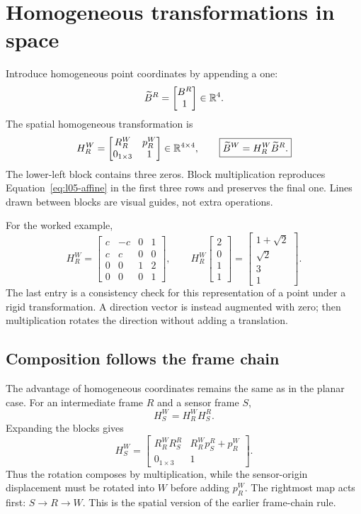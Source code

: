 \section{Homogeneous transformations in space}
Introduce homogeneous point coordinates by appending a one:
\[
 \widetilde B^R=\begin{bmatrix}B^R\\1\end{bmatrix}\in\mathbb{R}^4.
\]
The spatial homogeneous transformation is
\begin{equation}
 H_R^W=\begin{bmatrix}R_R^W&p_R^W\\0_{1\times3}&1\end{bmatrix}
 \in\mathbb{R}^{4\times4},\qquad
 \boxed{\widetilde B^W=H_R^W\widetilde B^R.}
 \label{eq:l05-homogeneous}
\end{equation}
The lower-left block contains three zeros. Block multiplication reproduces
Equation~\eqref{eq:l05-affine} in the first three rows and preserves the final
one. Lines drawn between blocks are visual guides, not extra operations.

For the worked example,
\[
 H_R^W=\begin{bmatrix}
 c&-c&0&1\\c&c&0&0\\0&0&1&2\\0&0&0&1
 \end{bmatrix},\qquad
 H_R^W\begin{bmatrix}2\\0\\1\\1\end{bmatrix}
 =\begin{bmatrix}1+\sqrt2\\\sqrt2\\3\\1\end{bmatrix}.
\]
The last entry is a consistency check for this representation of a point under
a rigid transformation. A direction vector is instead augmented with zero;
then multiplication rotates the direction without adding a translation.

\subsection{Composition follows the frame chain}
The advantage of homogeneous coordinates remains the same as in the planar
case. For an intermediate frame $R$ and a sensor frame $S$,
\begin{equation}
 H_S^W=H_R^W H_S^R.
 \label{eq:l05-composition}
\end{equation}
Expanding the blocks gives
\[
 H_S^W=\begin{bmatrix}
 R_R^W R_S^R&R_R^W p_S^R+p_R^W\\0_{1\times3}&1
 \end{bmatrix}.
\]
Thus the rotation composes by multiplication, while the sensor-origin
displacement must be rotated into $W$ before adding $p_R^W$. The rightmost
map acts first: $S\to R\to W$. This is the spatial version of the earlier
frame-chain rule.

